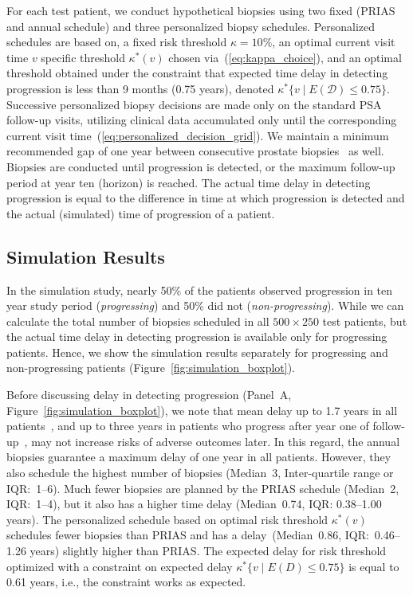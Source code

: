 For each test patient, we conduct hypothetical biopsies using two fixed (PRIAS and annual schedule) and three personalized biopsy schedules. Personalized schedules are based on, a fixed risk threshold $\kappa=10\%$, an optimal current visit time $v$ specific threshold $\kappa^*(v)$ chosen via~(\ref{eq:kappa_choice}), and an optimal threshold obtained under the constraint that expected time delay in detecting progression is less than 9 months (0.75 years), denoted $\kappa^*\{v \mid E(\mathcal{D})\leq 0.75\}$. Successive personalized biopsy decisions are made only on the standard PSA follow-up visits, utilizing clinical data accumulated only until the corresponding current visit time~(\ref{eq:personalized_decision_grid}). We maintain a minimum recommended gap of one year between consecutive prostate biopsies~\citep{bokhorst2015compliance} as well. Biopsies are conducted until progression is detected, or the maximum follow-up period at year ten (horizon) is reached. The actual time delay in detecting progression is equal to the difference in time at which progression is detected and the actual (simulated) time of progression of a patient.

\subsection{Simulation Results}
In the simulation study, nearly 50\% of the patients observed progression in ten year study period (\emph{progressing}) and 50\% did not (\emph{non-progressing}). While we can calculate the total number of biopsies scheduled in all $500 \times 250$ test patients, but the actual time delay in detecting progression is available only for progressing patients. Hence, we show the simulation results separately for progressing and non-progressing patients (Figure~\ref{fig:simulation_boxplot}).

Before discussing delay in detecting progression (Panel~A, Figure~\ref{fig:simulation_boxplot}), we note that mean delay up to 1.7 years in all patients~\citep{inoue2018comparative}, and up to three years in patients who progress after year one of follow-up~\citep{carvalho}, may not increase risks of adverse outcomes later. In this regard, the annual biopsies guarantee a maximum delay of one year in all patients. However, they also schedule the highest number of biopsies (Median~3, Inter-quartile range or IQR:~1--6). Much fewer biopsies are planned by the PRIAS schedule (Median~2, IQR:~1--4), but it also has a higher time delay (Median~0.74, IQR: 0.38--1.00 years). The personalized schedule based on optimal risk threshold $\kappa^*(v)$ schedules fewer biopsies than PRIAS and has a delay~(Median~0.86, IQR:~0.46--1.26 years) slightly higher than PRIAS. The expected delay for risk threshold optimized with a constraint on expected delay $\kappa^*\{v \mid E(D)\leq 0.75\}$ is equal to 0.61 years, i.e., the constraint works as expected.

